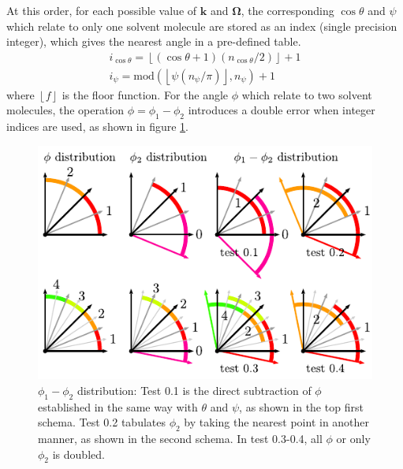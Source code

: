 At this order, for each possible value of $\mathbf{k}$ and $\mathbf{\Omega}$,
the corresponding $\cos\theta$ and $\psi$ which relate to only one
solvent molecule are stored as an index (single precision integer),
which gives the nearest angle in a pre-defined table.
\begin{equation}
\begin{array}{l}
i_{\cos\theta}=\left\lfloor (\cos\theta+1)(n_{\cos\theta}/2)\right\rfloor +1\\
i_{\psi}=\mathrm{mod}(\left\lfloor \psi(n_{\psi}/\pi)\right\rfloor ,n_{\psi})+1
\end{array}
\end{equation}
where $\left\lfloor f\right\rfloor $ is the floor function. For the
angle $\phi$ which relate to two solvent molecules, the operation
$\phi=\phi_{1}-\phi_{2}$ introduces a double error when integer indices
are used, as shown in figure \ref{fig:diff_phi}.

\begin{figure}[h]
\begin{centering}
\includegraphics{_figure/diff_phi}
\par\end{centering}

\caption[$\phi_{1}-\phi_{2}$ distribution]{$\phi_{1}-\phi_{2}$ distribution: Test 0.1 is the direct subtraction
of $\phi$ established in the same way with $\theta$ and $\psi$,
as shown in the top first schema. Test 0.2 tabulates $\phi_{2}$ by
taking the nearest point in another manner, as shown in the second
schema. In test 0.3-0.4, all $\phi$ or only $\phi_{2}$ is doubled.\label{fig:diff_phi}}
\end{figure}


